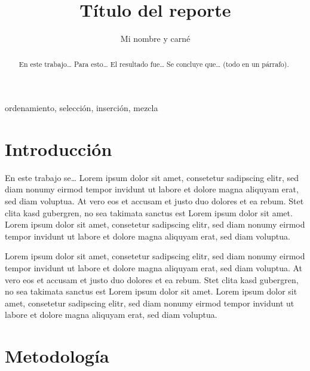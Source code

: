 \documentclass[twocolumn,english,spanish,journal]{IEEEtran}
\begin{document}
\title{Título del reporte}


\author{Mi nombre y carné}

%

\maketitle
{}%


\begin{abstract}
En este trabajo\ldots{} Para esto\ldots{} El resultado fue\ldots{}
Se concluye que\ldots{} (todo en un párrafo).
\end{abstract}

\renewcommand\IEEEkeywordsname{Palabras clave}
\begin{IEEEkeywords}
ordenamiento, selección, inserción, mezcla
\end{IEEEkeywords}

\section{Introducción}

En este trabajo se\ldots{} Lorem ipsum dolor sit
amet, consetetur sadipscing elitr, sed diam nonumy eirmod tempor invidunt
ut labore et dolore magna aliquyam erat, sed diam voluptua. At vero
eos et accusam et justo duo dolores et ea rebum. Stet clita kasd gubergren,
no sea takimata sanctus est Lorem ipsum dolor sit amet. Lorem ipsum
dolor sit amet, consetetur sadipscing elitr, sed diam nonumy eirmod
tempor invidunt ut labore et dolore magna aliquyam erat, sed diam
voluptua.

Lorem ipsum dolor sit amet, consetetur sadipscing elitr, sed diam
nonumy eirmod tempor invidunt ut labore et dolore magna aliquyam erat,
sed diam voluptua. At vero eos et accusam et justo duo dolores et
ea rebum. Stet clita kasd gubergren, no sea takimata sanctus est Lorem
ipsum dolor sit amet. Lorem ipsum dolor sit amet, consetetur sadipscing
elitr, sed diam nonumy eirmod tempor invidunt ut labore et dolore
magna aliquyam erat, sed diam voluptua.


\section{Metodología}
\end{document}
